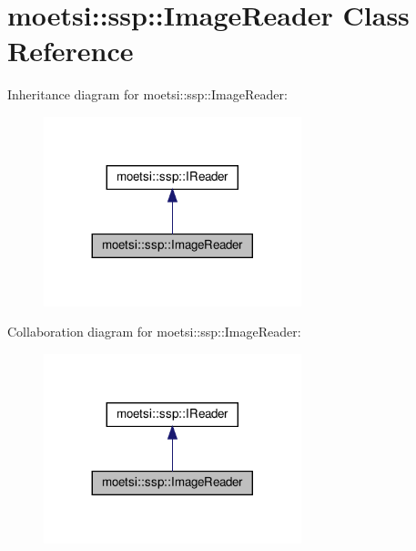 \hypertarget{classmoetsi_1_1ssp_1_1ImageReader}{}\section{moetsi\+:\+:ssp\+:\+:Image\+Reader Class Reference}
\label{classmoetsi_1_1ssp_1_1ImageReader}


Inheritance diagram for moetsi\+:\+:ssp\+:\+:Image\+Reader\+:\nopagebreak
\begin{figure}[H]
\begin{center}
\leavevmode
\includegraphics[width=212pt]{classmoetsi_1_1ssp_1_1ImageReader__inherit__graph}
\end{center}
\end{figure}


Collaboration diagram for moetsi\+:\+:ssp\+:\+:Image\+Reader\+:\nopagebreak
\begin{figure}[H]
\begin{center}
\leavevmode
\includegraphics[width=212pt]{classmoetsi_1_1ssp_1_1ImageReader__coll__graph}
\end{center}
\end{figure}
